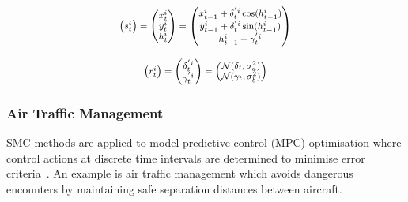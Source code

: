 \begin{equation}
\footnotesize
\begin{aligned}
  \begin{pmatrix}
    s^i_{t}    \\ 
  \end{pmatrix}
  =
  \begin{pmatrix}
    x^i_{t}    \\ 
    y^i_{t}    \\ 
    h^i_{t}    \\ 
  \end{pmatrix}
  =
  \begin{pmatrix}
  	x^i_{t-1} + \delta^{'i}_{t} \cos(h^i_{t-1}) \\
		y^i_{t-1} + \delta^{'i}_{t} \sin(h^i_{t-1}) \\
		h^i_{t-1} + \gamma^{'i}_{t} \\
  \end{pmatrix}
\end{aligned}
\label{eq:mcl_s}
\end{equation}

\begin{equation}
\footnotesize
\begin{aligned}
  \begin{pmatrix}
    r^i_{t}    \\ 
  \end{pmatrix}
  =
  \begin{pmatrix}
    \delta^{'i}_{t}    \\ 
    \gamma^{'i}_{t}    \\ 
  \end{pmatrix}
  =
  \begin{pmatrix}
  	\mathcal{N}(\delta_{t},\sigma_a^2) \\
		\mathcal{N}(\gamma_{t},\sigma_b^2) \\
  \end{pmatrix}
\end{aligned}
\label{eq:mcl_r}
\end{equation}


\subsubsection{Air Traffic Management}
\label{sec:atm}

SMC methods are applied to model predictive control (MPC) optimisation where control actions at discrete time intervals are determined to minimise error criteria~\cite{kantas09}.
An example is air traffic management which avoids dangerous encounters by maintaining safe separation distances between aircraft.

